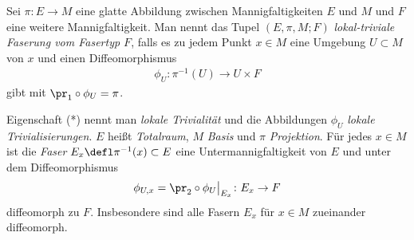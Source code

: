 \documentclass[%
	paper=a5,%
	fleqn,%
	DIV=18,%
	BCOR=0mm,
	fontsize=11pt,
	titlepage=false,%
	bibliography=totoc,
	DIV=18,%
	twoside=true,
	pdftitle=Riemannsche Geometrie,
	pdfauthor=Uwe Semmelmann,
	numbers=noendperiod]%
	{scrbook}
\begin{document}
\begin{defn}
Sei $\pi\colon E\to M$ eine glatte Abbildung zwischen Mannigfaltigkeiten $E$ und $M$
und $F$ eine weitere Mannigfaltigkeit. Man nennt das Tupel $(E,\pi,M;F)$
\emph{lokal-triviale Faserung vom Fasertyp $F$}, falls es zu jedem Punkt $x\in
M$ eine Umgebung $U\subset M$ von $x$ und einen Diffeomorphismus
\begin{align*}
\phi_U : \pi^{-1}(U)\to U\times F\tag{*}
\end{align*}
gibt mit $\pr_1\circ\phi_U = \pi$.\fish
\end{defn}


Eigenschaft (*) nennt man \emph{lokale Trivialität} und die Abbildungen
$\phi_U$ \emph{lokale Trivialisierungen}. $E$ heißt \emph{Totalraum}, $M$
\emph{Basis} und $\pi$ \emph{Projektion}.
Für jedes $x\in M$ ist die \emph{Faser} $E_x \defl \pi^{-1}(x) \subset E$
eine Untermannigfaltigkeit von $E$ und unter dem Diffeomorphismus
\begin{align*}
\phi_{U,x} = \pr_2\circ\phi_U\big|_{E_x} \colon E_x\to F
\end{align*}
diffeomorph zu $F$. Insbesondere sind alle Fasern $E_x$ für $x\in M$ zueinander
diffeomorph.
\end{document}
